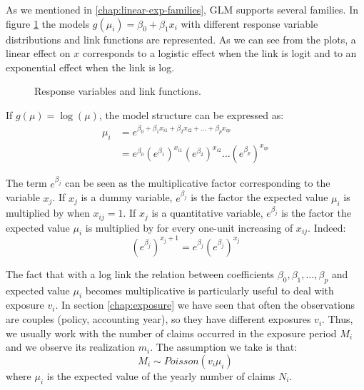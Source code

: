 \documentclass[a4paper, nobind]{templates/ociamthesis}
\theoremstyle{definition}
\theoremstyle{definition}
\theoremstyle{definition}
\theoremstyle{remark}
\begin{document}
As we mentioned in \ref{chap:linear-exp-families}, GLM supports several families. In figure \ref{fig:resp-var} the models \(g(\mu_i) = \beta_0 + \beta_1 x_i\) with different response variable distributions and link functions are represented. As we can see from the plots, a linear effect on \(x\) corresponds to a logistic effect when the link is logit and to an exponential effect when the link is log.





\begin{figure}[!hbtp]

{\centering {}\newline{}

}

\caption{Response variables and link functions.}\label{fig:resp-var}
\end{figure}

If \(g(\mu) = \log(\mu)\), the model structure can be expressed as:
\begin{align*}
\mu_i & = e^{\beta_0 + \beta_1 x_{i1} + \beta_2 x_{i2} + \dots + \beta_p x_{ip}} \\
& = e^{\beta_0} \left(e^{\beta_1}\right)^{x_{i1}} \left(e^{\beta_2}\right)^{x_{i2}} \dots \left(e^{\beta_p}\right)^{x_{ip}}
\end{align*}

The term \(e^{\beta_j}\) can be seen as the multiplicative factor corresponding to the variable \(x_j\). If \(x_j\) is a dummy variable, \(e^{\beta_j}\) is the factor the expected value \(\mu_i\) is multiplied by when \(x_{ij}=1\). If \(x_j\) is a quantitative variable, \(e^{\beta_j}\) is the factor the expected value \(\mu_i\) is multiplied by for every one-unit increasing of \(x_{ij}\). Indeed:
\[\left(e^{\beta_j}\right)^{x_j+1} = e^{\beta_j} \left(e^{\beta_j}\right)^{x_j}\]

The fact that with a log link the relation between coefficients \(\beta_0, \beta_1, \dots, \beta_p\) and expected value \(\mu_i\) becomes multiplicative is particularly useful to deal with exposure \(v_i\). In section \ref{chap:exposure} we have seen that often the observations are couples (policy, accounting year), so they have different exposures \(v_i\). Thus, we usually work with the number of claims occurred in the exposure period \(M_i\) and we observe its realization \(m_i\). The assumption we take is that:
\[M_i \sim Poisson(v_i \mu_i)\]
where \(\mu_i\) is the expected value of the yearly number of claims \(N_i\).
\end{document}
